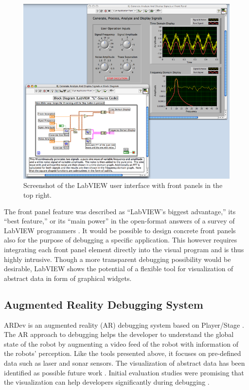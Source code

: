 \begin{figure}[htbp]
  \centering
  \includegraphics[scale=0.45]{img/labview_frontpanel.png}
  \caption{Screenshot of the LabVIEW user interface with front panels in the top right.}
  \label{labview_screenshot}
\end{figure}

The front panel feature was described as ``LabVIEW's biggest advantage,'' its ``best feature,'' or its ``main power'' in the open-format answers of a survey of LabVIEW programmers \cite{Whitley2001}. It would be possible to design concrete front panels also for the purpose of debugging a specific application. This however requires integrating each front panel element directly into the visual program and is thus highly intrusive. Though a more transparent debugging possibility would be desirable, LabVIEW shows the potential of a flexible tool for visualization of abstract data in form of graphical widgets.

\subsection{Augmented Reality Debugging System}
ARDev is an augmented reality (AR) debugging system based on Player/Stage \cite{Collett2010}. The AR approach to debugging helps the developer to understand the global state of the robot by augmenting a video feed of the robot with information of the robots' perception. Like the tools presented above, it focuses on pre-defined data such as laser and sonar sensors. The visualization of abstract data has been identified as possible future work \cite{Collett2010}. Initial evaluation studies were promising that the visualization can help developers significantly during debugging \cite{Collett2010}.


